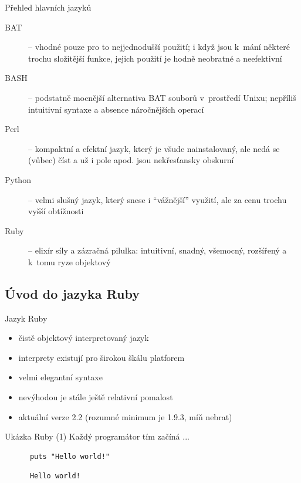 \documentclass{beamer}
\begin{document}
\begin{frame}{Přehled hlavních jazyků}
  \begin{description}
    \item[BAT] -- vhodné pouze pro to nejjednodušší použití; i když jsou k~mání některé trochu složitější funkce, jejich použití je hodně neobratné a neefektivní
    \item[BASH] -- podstatně mocnější alternativa BAT souborů v~prostředí Unixu; nepříliš intuitivní syntaxe a absence náročnějších operací
    \item[Perl] -- kompaktní a efektní jazyk, který je všude nainstalovaný, ale nedá se (vůbec) číst a už i pole apod. jsou nekřesťansky obskurní
    \item[Python] -- velmi slušný jazyk, který snese i ``vážnější'' využití, ale za cenu trochu vyšší obtížnosti
    \item[Ruby] -- elixír síly a zázračná pilulka: intuitivní, snadný, všemocný, rozšířený a k~tomu ryze objektový
  \end{description}
\end{frame}

\subsection{Úvod do jazyka Ruby}

\begin{frame}{Jazyk Ruby}
  \begin{itemize}
    \item čistě objektový interpretovaný jazyk
    \item interprety existují pro širokou škálu platforem
    \item velmi elegantní syntaxe
    \item nevýhodou je stále ještě relativní pomalost
    \item aktuální verze 2.2 (rozumné minimum je 1.9.3, míň nebrat)
  \end{itemize}
\end{frame}

\begin{frame}[fragile]{Ukázka Ruby (1)}
  Každý programátor tím začíná ...
  \begin{block}{}
    \smallskip \footnotesize
    {\scriptsize \begin{verbatim}
      puts "Hello world!"
    \end{verbatim}}
  \end{block}
  \pause
  \begin{block}{}
    \smallskip \footnotesize
    {\scriptsize \begin{verbatim}
      Hello world!
    \end{verbatim}}
  \end{block}
\end{frame}
\end{document}
